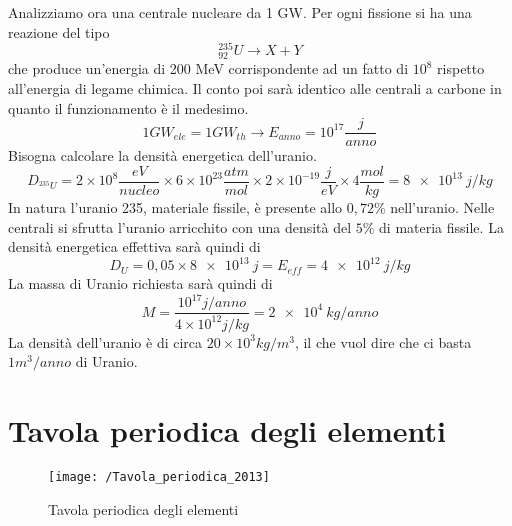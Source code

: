 Analizziamo ora una centrale nucleare da 1 GW.
Per ogni fissione si ha una reazione del tipo
\begin{equation}
_{92}^{235}U\longrightarrow X+Y
\end{equation}
che produce un'energia di 200 MeV corrispondente ad un fatto di $10^8$ rispetto all'energia di legame chimica.
Il conto poi sarà identico alle centrali a carbone in quanto il funzionamento è il medesimo.
\begin{equation}
1GW_{ele}=1GW_{th}\longrightarrow E_{anno}=10^{17}\frac{j}{anno}
\end{equation}
Bisogna calcolare la densità energetica dell'uranio.
\begin{equation}
D_{^{235}U}=2\times10^8\frac{eV}{nucleo}\times 6\times10^{23}\frac{atm}{mol}\times2\times10^{-19}\frac{j}{eV}\times4\frac{mol}{kg}=\SI{8e13}{j/kg}
\end{equation}
In natura l'uranio 235, materiale fissile, è presente allo $0,72\%$ nell'uranio. 
Nelle centrali si sfrutta l'uranio arricchito con una densità del $5\%$ di materia fissile.
La densità energetica effettiva sarà quindi di 
\begin{equation}
D_U=0,05\times\SI{8e13}{j}=E_{eff}=\SI{4e12}{j/kg}
\end{equation}
La massa di Uranio richiesta sarà quindi di 
\begin{equation}
M=\frac{10^{17}j/anno}{4\times10^{12}j/kg}=\SI{2e4}{kg/anno}
\end{equation}
La densità dell'uranio è di circa $20\times10^3 kg/m^3$, il che vuol dire che ci basta $1 m^3/anno$ di Uranio.


\section{Tavola periodica degli elementi}
\begin{figure}[h]
\centering
\texttt{[image: /Tavola\_periodica\_2013]}
\caption{Tavola periodica degli elementi}
\end{figure}
